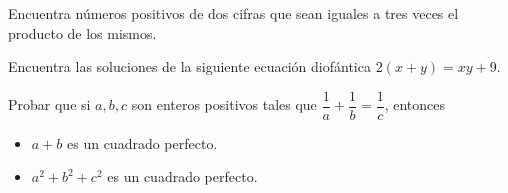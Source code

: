 \begin{exercise}
    Encuentra números positivos de dos cifras que sean iguales a tres veces el producto de los mismos.
\end{exercise}

\begin{exercise}
    Encuentra las soluciones de la siguiente ecuación diofántica $2(x + y) = xy + 9$.
\end{exercise}

\begin{exercise}
    Probar que si $a,b,c$ son enteros positivos tales que $\dfrac{1}{a} + \dfrac{1}{b} = \dfrac{1}{c}$, entonces
    \begin{itemize}
        \item $a + b$ es un cuadrado perfecto.
        \item $a^2 + b^2 + c^2$ es un cuadrado perfecto.
    \end{itemize}
\end{exercise}